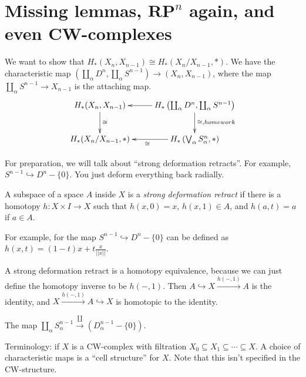 \section{Missing lemmas, $\mathbf{RP}^n$ again, and even CW-complexes}
\begin{lemma}
We want to show that $ H_\ast(X_n,X_{n-1})\cong H_\ast(X_n/X_{n-1},\ast)$. We have the characteristic map $\left(\coprod_\alpha D^n,\coprod_\alpha S^{n-1}\right)\to (X_n,X_{n-1})$, where the map $\coprod_\alpha S^{n-1}\to X_{n-1}$ is the attaching map.
\begin{equation*}
\xymatrix{ H_\ast(X_n,X_{n-1})\ar[d]^\cong & H_\ast\left(\coprod_\alpha D^n,\coprod_\alpha S^{n-1}\right)\ar[l]\ar[d]^{\cong,homework}\\
 H_\ast(X_n/X_{n-1},\ast) & H_\ast\left(\bigvee_{\alpha}S^n_\alpha,\ast\right)\ar[l]^\cong}
\end{equation*}
\end{lemma}
For preparation, we will talk about ``strong deformation retracts''. For example, $S^{n-1}\hookrightarrow D^n-\{0\}$. You just deform everything back radially.
\begin{definition}
A subspace of a space $A$ inside $X$ is a \emph{strong deformation retract} if there is a homotopy $h:X\times I\to X$ such that $h(x,0)=x$, $h(x,1)\in A$, and $h(a,t)=a$ if $a\in A$.
\end{definition}
\begin{example}
For example, for the map $S^{n-1}\hookrightarrow D^n-\{0\}$ can be defined as $h(x,t)=(1-t)x+t\frac{x}{||x||}$.
\end{example}
A strong deformation retract is a homotopy equivalence, because we can just define the homotopy inverse to be $h(-,1)$. Then $A\hookrightarrow X\xrightarrow{h(-,1)}A$ is the identity, and $X\xrightarrow{h(-,1)}A\hookrightarrow X$ is homotopic to the identity.
\begin{example}
The map $\coprod_\alpha S^{n-1}_\alpha\xrightarrow\coprod(D^{n-1}_\alpha-\{0\})$.
\end{example}
Terminology: if $X$ is a CW-complex with filtration $X_0\subseteq X_1\subseteq\cdots\subseteq X$. A choice of characteristic maps is a ``cell structure'' for $X$. Note that this isn't specified in the CW-structure.

